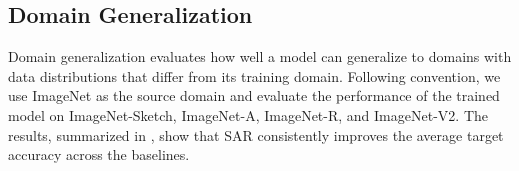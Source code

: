 \subsection{Domain Generalization}
Domain generalization evaluates how well a model can generalize to domains with data distributions that differ from its training domain. Following convention, we use ImageNet as the source domain and evaluate the performance of the trained model on ImageNet-Sketch, ImageNet-A, ImageNet-R, and ImageNet-V2. The results, summarized in , show that SAR consistently improves the average target accuracy across the baselines.

